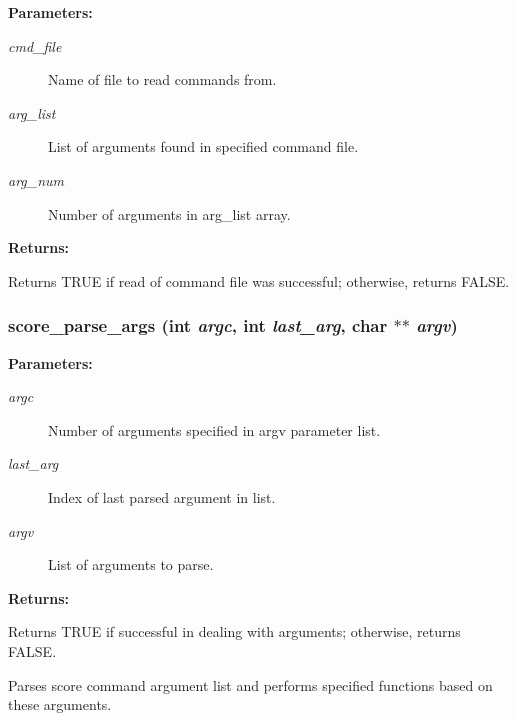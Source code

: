 \begin{Desc}
\item[{\bf Parameters: }]\par
\begin{description}
\item[
{\em cmd\_\-file}]Name of file to read commands from. \item[
{\em arg\_\-list}]List of arguments found in specified command file. \item[
{\em arg\_\-num}]Number of arguments in arg\_\-list array. \end{description}
\end{Desc}
\begin{Desc}
\item[{\bf Returns: }]\par
Returns TRUE if read of command file was successful; otherwise, returns FALSE. \end{Desc}
\subsubsection{ score\_\-parse\_\-args (int {\em argc}, int {\em last\_\-arg}, char $\ast$$\ast$ {\em argv})}\label{score_8c_a14}


\begin{Desc}
\item[{\bf Parameters: }]\par
\begin{description}
\item[
{\em argc}]Number of arguments specified in argv parameter list. \item[
{\em last\_\-arg}]Index of last parsed argument in list. \item[
{\em argv}]List of arguments to parse.

\end{description}
\end{Desc}
\begin{Desc}
\item[{\bf Returns: }]\par
Returns TRUE if successful in dealing with arguments; otherwise, returns FALSE.

\end{Desc}
Parses score command argument list and performs specified functions based on these arguments. 

